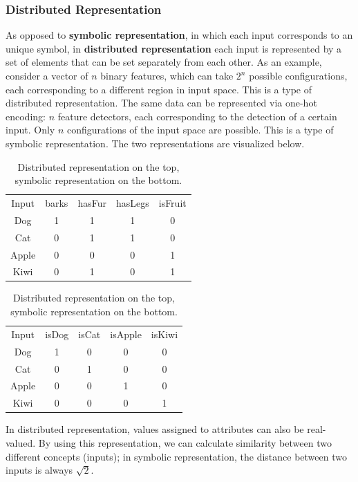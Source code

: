 \subsubsection{Distributed Representation}

As opposed to \textbf{symbolic representation}, in which each input corresponds to an unique symbol, in \textbf{distributed representation} each input is represented by a set of elements that can be set separately from each other. As an example, consider a vector of $n$ binary features, which can take $2^n$ possible configurations, each corresponding to a different region in input space. This is a type of distributed representation. The same data can be represented via one-hot encoding: $n$ feature detectors, each corresponding to the detection of a certain input. Only $n$ configurations of the input space are possible. This is a type of symbolic representation. The two representations are visualized below.

\begin{table}[ht]
    \centering
    \begin{tabular}{|c|cccc|}
        \hline
        \rowcolor{gray}
        Input & barks & hasFur & hasLegs & isFruit \\
        Dog & 1 & 1 & 1 & 0 \\
        Cat & 0 & 1 & 1 & 0\\
        Apple & 0 & 0 & 0 & 1\\
        Kiwi & 0 & 1 & 0 & 1\\
        \hline
    \end{tabular} 
\quad
    \begin{tabular}{|c|cccc|}
        \hline
        \rowcolor{gray}
        Input & isDog & isCat & isApple & isKiwi \\
        Dog & 1 & 0 & 0 & 0 \\
        Cat & 0 & 1 & 0 & 0 \\
        Apple & 0 & 0 & 1 & 0 \\
        Kiwi & 0 & 0 & 0 & 1 \\
        \hline
    \end{tabular}
    \caption{Distributed representation on the top, symbolic representation on the bottom.}
\end{table}

In distributed representation, values assigned to attributes can also be real-valued. By using this representation, we can calculate similarity between two different concepts (inputs); in symbolic representation, the distance between two inputs is always $\sqrt{2}$.

